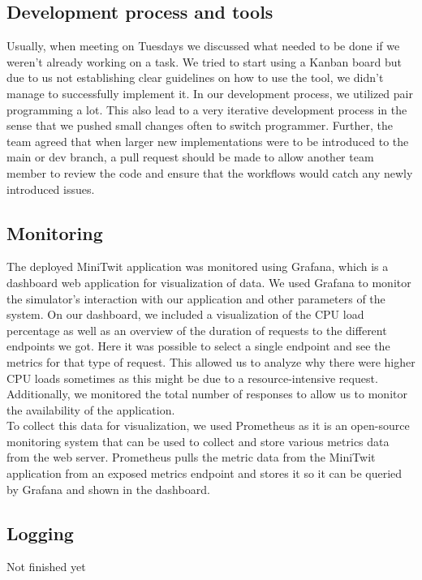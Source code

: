 \subsection{Development process and tools}
Usually, when meeting on Tuesdays we discussed what needed to be done if we weren't already working on a task. We tried to start using a Kanban board but due to us not establishing 
clear guidelines on how to use the tool, we didn't manage to successfully implement it. In our development process, we utilized pair programming a lot. This also lead to a very iterative development 
process in the sense that we pushed small changes often to switch programmer. Further, the team agreed that when larger new implementations were to be introduced
to the main or dev branch, a pull request should be made to allow another team member to review the code and ensure that the workflows would catch any newly
introduced issues. 

\subsection{Monitoring}
The deployed MiniTwit application was monitored using Grafana, which is a dashboard web application for visualization of data. 
We used Grafana to monitor the simulator's interaction with our application and other parameters of the system. On our dashboard, 
we included a visualization of the CPU load percentage as well as an overview of the duration of requests to the different endpoints  
we got. Here it was possible to select a single endpoint and see the metrics for that type of request. This allowed us to analyze why 
there were higher CPU loads sometimes as this might be due to a resource-intensive request. Additionally, we monitored the total number of
responses to allow us to monitor the availability of the application. \\

To collect this data for visualization, we used Prometheus as it is an open-source monitoring system that can be used to collect 
and store various metrics data from the web server. Prometheus pulls the metric data from the MiniTwit application from an exposed metrics endpoint
and stores it so it can be queried by Grafana and shown in the dashboard.  

\subsection{Logging}
Not finished yet


